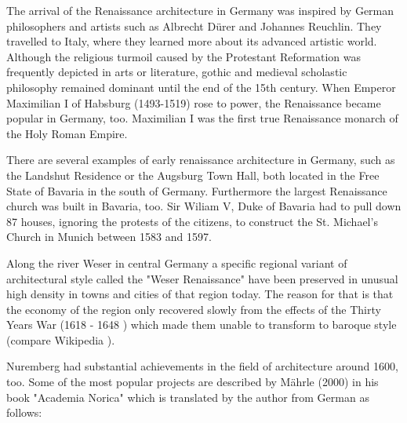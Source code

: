 The arrival of the Renaissance architecture in Germany was inspired by German philosophers and artists such as Albrecht Dürer and Johannes Reuchlin. They travelled to Italy, where they learned more about its advanced artistic world. Although the religious turmoil caused by the Protestant Reformation was frequently depicted in arts or literature, gothic and medieval scholastic philosophy remained dominant until the end of the 15th century. When Emperor Maximilian I of Habsburg (1493-1519) rose to power, the Renaissance became popular in Germany, too. Maximilian I was the first true Renaissance monarch of the Holy Roman Empire.

There are several examples of early renaissance architecture in Germany, such as the Landshut Residence or the Augsburg Town Hall, both located in the Free State of Bavaria in the south of Germany. Furthermore the largest Renaissance church was built in Bavaria, too. Sir Wiliam V, Duke of Bavaria had to pull down 87 houses, ignoring the protests of the citizens, to construct the St. Michael's Church in Munich between 1583 and 1597.

Along the river Weser in central Germany a specific regional variant of architectural style called the "Weser Renaissance" have been preserved in unusual high density in towns and cities of that region today. The reason for that is that the economy of the region only recovered slowly from the effects of the Thirty Years War (1618 - 1648 ) which made them unable to transform to baroque style (compare Wikipedia \parencite{wiki:GermanRenaissance}).

Nuremberg had substantial achievements in the field of architecture around 1600, too. Some of the most popular projects are described by Mährle (2000) in his book "Academia Norica" \parencite{bookAcademiaNorica} which is translated by the author from German as follows: 

